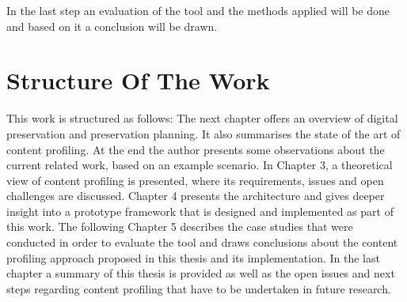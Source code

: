 In the last step an evaluation of the tool and the methods applied will be done and based on it a conclusion will be drawn.

\section{Structure Of The Work}
\label{sec:structure_of_the_work}
This work is structured as follows: The next chapter offers an overview of digital preservation and preservation planning.
It also summarises the state of the art of content profiling. At the end the author presents some observations about the current related work, based on an example scenario.
In Chapter 3, a theoretical view of content profiling is presented, where its requirements, issues and open challenges are discussed.
Chapter 4 presents the architecture and gives deeper insight into a prototype framework that is designed and implemented as part of this work.
The following Chapter 5 describes the case studies that were conducted in order to evaluate the tool and draws conclusions about the content profiling approach proposed in this thesis and its implementation.
In the last chapter a summary of this thesis is provided as well as the open issues and next steps regarding content profiling that have to be undertaken in future research.